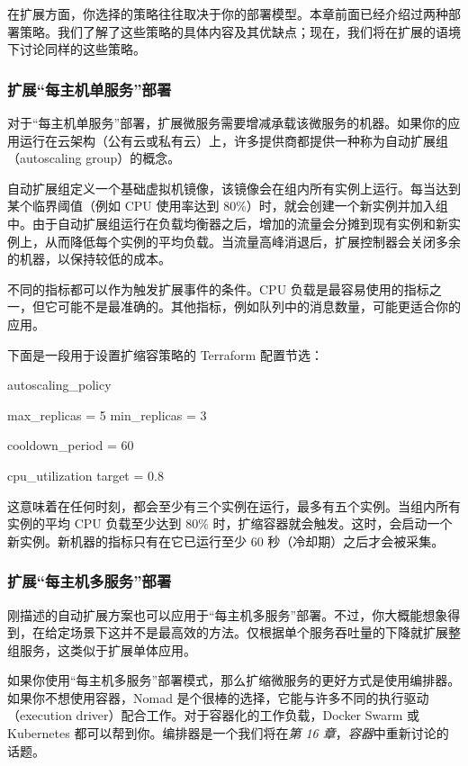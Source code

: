 在扩展方面，你选择的策略往往取决于你的部署模型。本章前面已经介绍过两种部署策略。我们了解了这些策略的具体内容及其优缺点；现在，我们将在扩展的语境下讨论同样的这些策略。

\subsubsection{扩展“每主机单服务”部署}

\label{idx:1449}
对于“每主机单服务”部署，扩展微服务需要增减承载该微服务的机器。如果你的应用运行在云架构（公有云或私有云）上，许多提供商都提供一种称为自动扩展组（autoscaling group）的概念。

自动扩展组定义一个基础虚拟机镜像，该镜像会在组内所有实例上运行。每当达到某个临界阈值（例如 CPU 使用率达到 80\%）时，就会创建一个新实例并加入组中。由于自动扩展组运行在负载均衡器之后，增加的流量会分摊到现有实例和新实例上，从而降低每个实例的平均负载。当流量高峰消退后，扩展控制器会关闭多余的机器，以保持较低的成本。

不同的指标都可以作为触发扩展事件的条件。CPU 负载是最容易使用的指标之一，但它可能不是最准确的。其他指标，例如队列中的消息数量，可能更适合你的应用。

下面是一段用于设置扩缩容策略的 Terraform 配置节选：

\begin{codebox}[text]
autoscaling_policy {
    max_replicas = 5
    min_replicas = 3
 
    cooldown_period = 60
 
    cpu_utilization {
      target = 0.8
    }
}
\end{codebox}

\label{idx:1450}
这意味着在任何时刻，都会至少有三个实例在运行，最多有五个实例。当组内所有实例的平均 CPU 负载至少达到 80\% 时，扩缩容器就会触发。这时，会启动一个新实例。新机器的指标只有在它已运行至少 60 秒（冷却期）之后才会被采集。

\subsubsection{扩展“每主机多服务”部署}

\label{idx:1451}
\label{idx:1452}
刚描述的自动扩展方案也可以应用于“每主机多服务”部署。不过，你大概能想象得到，在给定场景下这并不是最高效的方法。仅根据单个服务吞吐量的下降就扩展整组服务，这类似于扩展单体应用。

如果你使用“每主机多服务”部署模式，那么扩缩微服务的更好方式是使用编排器。如果你不想使用容器，Nomad 是个很棒的选择，它能与许多不同的执行驱动（execution driver）配合工作。对于容器化的工作负载，Docker Swarm 或 Kubernetes 都可以帮到你。编排器是一个我们将在\emph{第 16 章}，\emph{容器}中重新讨论的话题。

